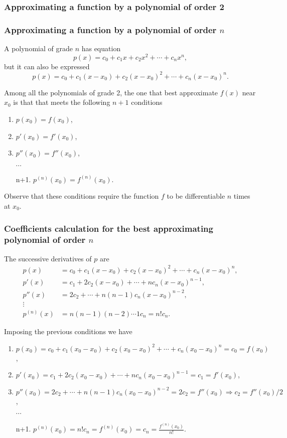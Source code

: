 \begin{frame}
\frametitle{Approximating a function by a polynomial of order 2}
\begin{center}

\end{center}
\end{frame}


\begin{frame}
\frametitle{Approximating a function by a polynomial of order $n$}
A polynomial of grade $n$ has equation
\[
p(x) = c_0+c_1x+c_2x^2+\cdots +c_nx^n,
\]
but it can also be expressed
\[
p(x) = c_0+c_1(x-x_0)+c_2(x-x_0)^2+\cdots +c_n(x-x_0)^n.
\]

Among all the polynomials of grade 2, the one that best approximate $f(x)$ near $x_0$ is that that meets the following $n+1$ conditions
\begin{enumerate}
\item $p(x_0) = f(x_0)$,
\item $p'(x_0) = f'(x_0)$,
\item $p''(x_0)=f''(x_0)$,
\item[] $\cdots$
\item[n+1.] $p^{(n)}(x_0)=f^{(n)}(x_0)$.
\end{enumerate}

\alert{Observe that these conditions require the function $f$ to be differentiable $n$ times at $x_0$.}
\end{frame}


\begin{frame}
\frametitle{Coefficients calculation for the best approximating polynomial of order $n$}
The successive derivatives of $p$ are 
\begin{align*}
p(x) &= c_0+c_1(x-x_0)+c_2(x-x_0)^2+\cdots +c_n(x-x_0)^n,\\
p'(x)& = c_1+2c_2(x-x_0)+\cdots +nc_n(x-x_0)^{n-1},\\
p''(x)& = 2c_2+\cdots +n(n-1)c_n(x-x_0)^{n-2},\\
\vdots\ \
\\
p^{(n)}(x)&= n(n-1)(n-2)\cdots 1 c_n=n!c_n.
\end{align*}

Imposing the previous conditions we have
\begin{enumerate}
\item $p(x_0) = c_0+c_1(x_0-x_0)+c_2(x_0-x_0)^2+\cdots +c_n(x_0-x_0)^n=c_0=f(x_0)$,
\item $p'(x_0) = c_1+2c_2(x_0-x_0)+\cdots +nc_n(x_0-x_0)^{n-1}=c_1=f'(x_0)$,
\item $p''(x_0) = 2c_2+\cdots +n(n-1)c_n(x_0-x_0)^{n-2}=2c_2=f''(x_0)\Rightarrow c_2=f''(x_0)/2$,
\item[] $\cdots$
\item[n+1.] $p^{(n)}(x_0)=n!c_n=f^{(n)}(x_0)=c_n=\frac{f^{(n)}(x_0)}{n!}$.
\end{enumerate}
\end{frame}


